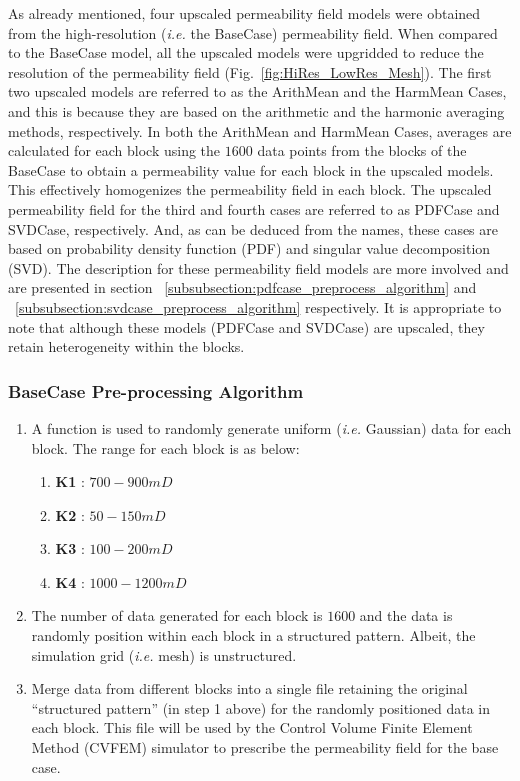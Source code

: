 \documentclass[preprint,12pt]{elsarticle}
\begin{document}
As already mentioned, four upscaled permeability field models were obtained from the high-resolution ({\it i.e.} the BaseCase) permeability field. When compared to the BaseCase model, all the upscaled models were upgridded to reduce the resolution of the permeability field (Fig.~\ref{fig:HiRes_LowRes_Mesh}). The first two upscaled models are referred to as the ArithMean and the HarmMean Cases, and this is because they are based on the arithmetic and the harmonic averaging methods, respectively. In both the ArithMean and HarmMean Cases, averages are calculated for each block using the $1600$ data points from the blocks of the BaseCase to obtain a permeability value for each block in the upscaled models. This effectively homogenizes the permeability field in each block. The upscaled permeability field for the third and fourth cases are referred to as PDFCase and SVDCase, respectively. And, as can be deduced from the names, these cases are based on probability density function (PDF) and singular value decomposition (SVD). The description for these permeability field models are more involved and are presented in section ~\ref{subsubsection:pdfcase_preprocess_algorithm} and ~\ref{subsubsection:svdcase_preprocess_algorithm} respectively. It is appropriate to note that although these models (PDFCase and SVDCase) are upscaled, they retain heterogeneity within the blocks.

\subsubsection{BaseCase Pre-processing Algorithm}\label{subsubsection:basecase_preprocess_algorithm}
\begin{enumerate}[1]
  \item A function is used to randomly generate uniform ({\it i.e.} Gaussian) data for each block. The range for each block is as below:
  \begin{enumerate}[a]
    \item \textbf{K1} : $700 - 900mD$
    \item \textbf{K2} : $50 - 150mD$
    \item \textbf{K3} : $100 - 200mD$
    \item \textbf{K4} : $1000 - 1200mD$
  \end{enumerate}                                                    
  \item The number of data generated for each block is $1600$ and the data is randomly position within each block in a structured pattern. Albeit, the simulation grid ({\it i.e.} mesh) is unstructured.
  \item Merge data from different blocks into a single file retaining the original ``structured pattern'' (in step 1 above) for the randomly positioned data in each block. This file will be used by the Control Volume Finite Element Method (CVFEM) simulator to prescribe the permeability field for the base case.
\end{enumerate}
\end{document}
